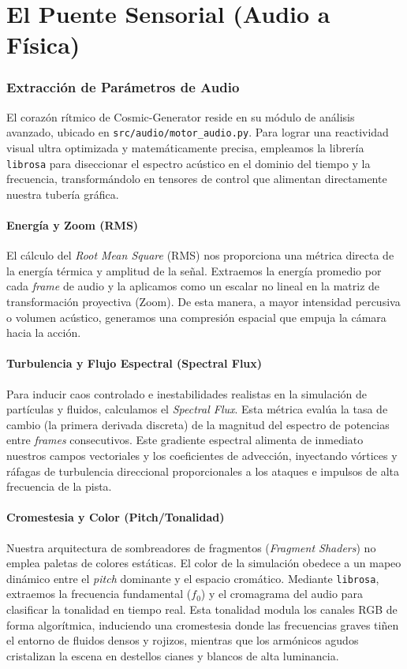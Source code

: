 \documentclass[12pt]{book}
\begin{document}
\part{El Puente Sensorial (Audio a Física)}

\section{Extracción de Parámetros de Audio}
\label{sec:extraccion_audio}

El corazón rítmico de Cosmic-Generator reside en su módulo de análisis avanzado, ubicado en \texttt{src/audio/motor\_audio.py}. Para lograr una reactividad visual ultra optimizada y matemáticamente precisa, empleamos la librería \texttt{librosa} para diseccionar el espectro acústico en el dominio del tiempo y la frecuencia, transformándolo en tensores de control que alimentan directamente nuestra tubería gráfica.

\subsection{Energía y Zoom (RMS)}
El cálculo del \textit{Root Mean Square} (RMS) nos proporciona una métrica directa de la energía térmica y amplitud de la señal.
Extraemos la energía promedio por cada \textit{frame} de audio y la aplicamos como un escalar no lineal en la matriz de transformación proyectiva (Zoom). De esta manera, a mayor intensidad percusiva o volumen acústico, generamos una compresión espacial que empuja la cámara hacia la acción.

\subsection{Turbulencia y Flujo Espectral (Spectral Flux)}
Para inducir caos controlado e inestabilidades realistas en la simulación de partículas y fluidos, calculamos el \textit{Spectral Flux}. Esta métrica evalúa la tasa de cambio (la primera derivada discreta) de la magnitud del espectro de potencias entre \textit{frames} consecutivos.
Este gradiente espectral alimenta de inmediato nuestros campos vectoriales y los coeficientes de advección, inyectando vórtices y ráfagas de turbulencia direccional proporcionales a los ataques e impulsos de alta frecuencia de la pista.

\subsection{Cromestesia y Color (Pitch/Tonalidad)}
Nuestra arquitectura de sombreadores de fragmentos (\textit{Fragment Shaders}) no emplea paletas de colores estáticas. El color de la simulación obedece a un mapeo dinámico entre el \textit{pitch} dominante y el espacio cromático.
Mediante \texttt{librosa}, extraemos la frecuencia fundamental ($f_0$) y el cromagrama del audio para clasificar la tonalidad en tiempo real. Esta tonalidad modula los canales RGB de forma algorítmica, induciendo una cromestesia donde las frecuencias graves tiñen el entorno de fluidos densos y rojizos, mientras que los armónicos agudos cristalizan la escena en destellos cianes y blancos de alta luminancia.
\end{document}
